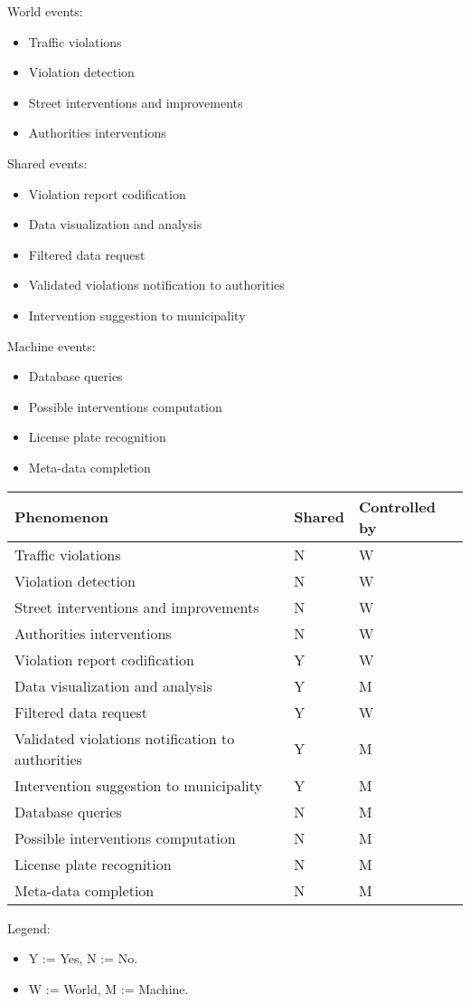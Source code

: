 World events:
\begin{itemize}
    \item Traffic violations
    \item Violation detection
    \item Street interventions and improvements
    \item Authorities interventions
\end{itemize}

Shared events:
\begin{itemize}
    \item Violation report codification
    \item Data visualization and analysis
    \item Filtered data request
    \item Validated violations notification to authorities
    \item Intervention suggestion to municipality
\end{itemize}

Machine events:
\begin{itemize}
    \item Database queries
    \item Possible interventions computation
    \item License plate recognition
    \item Meta-data completion
\end{itemize}

\bigskip
\begin{center}
\begin{tabular}{|p{9cm}|l|l|}
	\hline 
	Phenomenon & Shared & Controlled by\\ 
	\hline 
	Traffic violations &  N & W \\ 
	\hline 
	Violation detection &  N & W\\ 
	\hline 
	Street interventions and improvements & N &  W \\ 
	\hline 
	Authorities interventions & N &  W \\
	\hline 
	Violation report codification & Y & W\\ 
	\hline 
	Data visualization and analysis & Y & M\\ 
	\hline
	Filtered data request & Y & W\\
	\hline 
	Validated violations notification to authorities & Y & M\\ 
	\hline 
	Intervention suggestion to municipality & Y & M\\ 
	\hline 
	Database queries & N & M\\ 
	\hline
	Possible interventions computation & N & M\\ 
	\hline
	License plate recognition & N & M\\ 
	\hline
	Meta-data completion & N & M\\ 
	\hline
\end{tabular} 
\end{center}
Legend:
\begin{itemize}
	\item Y := Yes, N := No.
	\item W := World, M := Machine.
\end{itemize}